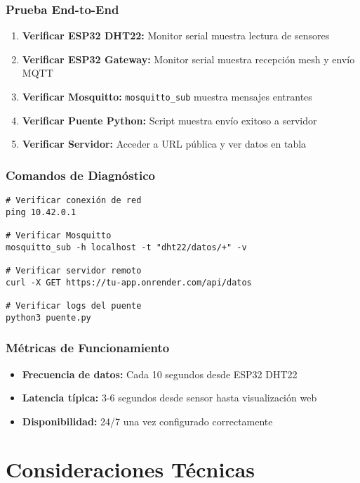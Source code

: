 \documentclass[12pt]{article}
\begin{document}
\subsubsection{Prueba End-to-End}
\begin{enumerate}
    \item \textbf{Verificar ESP32 DHT22:} Monitor serial muestra lectura de sensores
    \item \textbf{Verificar ESP32 Gateway:} Monitor serial muestra recepción mesh y envío MQTT
    \item \textbf{Verificar Mosquitto:} \texttt{mosquitto\_sub} muestra mensajes entrantes
    \item \textbf{Verificar Puente Python:} Script muestra envío exitoso a servidor
    \item \textbf{Verificar Servidor:} Acceder a URL pública y ver datos en tabla
\end{enumerate}

\subsubsection{Comandos de Diagnóstico}
\begin{verbatim}
# Verificar conexión de red
ping 10.42.0.1

# Verificar Mosquitto
mosquitto_sub -h localhost -t "dht22/datos/+" -v

# Verificar servidor remoto
curl -X GET https://tu-app.onrender.com/api/datos

# Verificar logs del puente
python3 puente.py
\end{verbatim}

\subsubsection{Métricas de Funcionamiento}
\begin{itemize}
    \item \textbf{Frecuencia de datos:} Cada 10 segundos desde ESP32 DHT22
    \item \textbf{Latencia típica:} 3-6 segundos desde sensor hasta visualización web
    \item \textbf{Disponibilidad:} 24/7 una vez configurado correctamente
\end{itemize}

\section{Consideraciones Técnicas}
\end{document}
